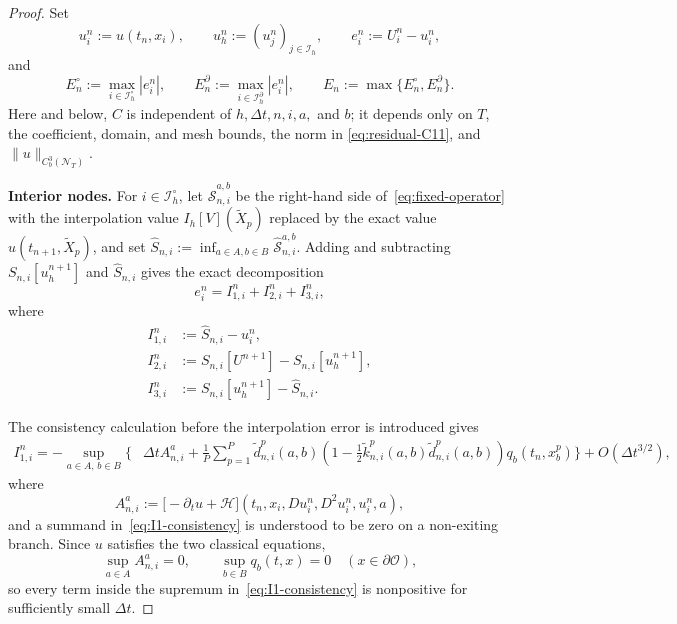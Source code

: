 \documentclass[11pt]{article}
\theoremstyle{definition}
\theoremstyle{remark}
\newcommand{\cO}{\mathcal{O}}
\newcommand{\cS}{\mathcal{S}}
\newcommand{\dt}{\Delta t}
\begin{document}
	\begin{proof}
		Set
		\[
		u_i^n:=u(t_n,x_i),\qquad
		u_h^n:=(u_j^n)_{j\in\mathcal I_h},\qquad
		e_i^n:=U_i^n-u_i^n,
		\]
		and
		\[
		E_n^\circ:=\max_{i\in\mathcal I_h^\circ}|e_i^n|,\qquad
		E_n^\partial:=\max_{i\in\mathcal I_h^\partial}|e_i^n|,\qquad
		E_n:=\max\{E_n^\circ,E_n^\partial\}.
		\]
		Here and below, $C$ is independent of $h,\dt,n,i,a,$ and $b$; it depends
		only on $T$, the coefficient, domain, and mesh bounds, the norm in
		\eqref{eq:residual-C11}, and $\|u\|_{C_b^3(\mathcal N_T)}$.
		
		\medskip
		\noindent\textbf{Interior nodes.}
		For $i\in\mathcal I_h^\circ$, let $\widehat{\cS}_{n,i}^{a,b}$ be the
		right-hand side of~\eqref{eq:fixed-operator} with the interpolation value
		$I_h[V](\widetilde X_p)$ replaced by the exact value
		$u(t_{n+1},\widetilde X_p)$, and set
		$\widehat S_{n,i}:=\inf_{a\in A,b\in B}\widehat{\cS}_{n,i}^{a,b}$.
		Adding and subtracting $S_{n,i}[u_h^{n+1}]$ and $\widehat S_{n,i}$ gives
		the exact decomposition
		\begin{equation}
			e_i^n=I_{1,i}^n+I_{2,i}^n+I_{3,i}^n,
			\label{eq:three-error-parts}
		\end{equation}
		where
		\begin{align*}
			I_{1,i}^n&:=\widehat S_{n,i}-u_i^n,\\
			I_{2,i}^n&:=S_{n,i}[U^{n+1}]-S_{n,i}[u_h^{n+1}],\\
			I_{3,i}^n&:=S_{n,i}[u_h^{n+1}]-\widehat S_{n,i}.
		\end{align*}
		
		The consistency calculation before the interpolation error is introduced
		gives
		\begin{align}
			I_{1,i}^n
			=-\sup_{a\in A,\,b\in B}\Biggl\{&
			\dt A_{n,i}^a
			+\frac1P\sum_{p=1}^P\widetilde d_{n,i}^p(a,b)
			\left(1-\frac12\widetilde k_{n,i}^p(a,b)
			\widetilde d_{n,i}^p(a,b)\right)
			q_b(t_n,x_b^p)\Biggr\}
			+O(\dt^{3/2}),
			\label{eq:I1-consistency}
		\end{align}
		where
		\[
		A_{n,i}^a:=
		\bigl[-\partial_tu+\mathcal H\bigr]
		(t_n,x_i,Du_i^n,D^2u_i^n,u_i^n,a),
		\]
		and a summand in~\eqref{eq:I1-consistency} is understood to be zero on a
		non-exiting branch.  Since $u$ satisfies the two classical equations,
		\[
		\sup_{a\in A}A_{n,i}^a=0,
		\qquad \sup_{b\in B}q_b(t,x)=0
		\quad (x\in\partial\cO),
		\]
		so every term inside the supremum in~\eqref{eq:I1-consistency} is
		nonpositive for sufficiently small $\dt$.
		

\end{proof}
\end{document}
